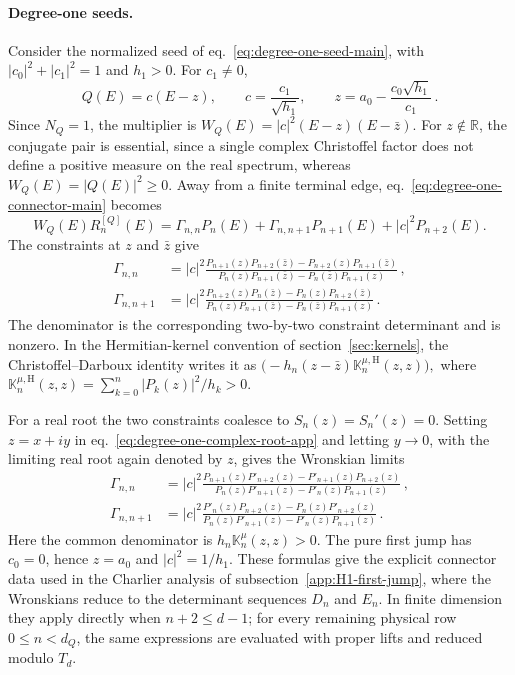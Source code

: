 \documentclass[a4paper,11pt]{article}
\def\ii{i}%
\theoremstyle{definition}
\theoremstyle{remark}
\newcommand{\ii}{\mathrm i}
\newcommand{\RR}{\mathbb R}
\begin{document}
\paragraph{Degree-one seeds.}
Consider the normalized seed of eq.~\eqref{eq:degree-one-seed-main}, with $|c_0|^2+|c_1|^2=1$ and $h_1>0$. For $c_1\ne0$,
\begin{equation}
   Q(E)=c(E-z),
   \qquad
   c=\frac{c_1}{\sqrt{h_1}},
   \qquad
   z=a_0-\frac{c_0\sqrt{h_1}}{c_1}\,.
\end{equation}
Since $N_Q=1$, the multiplier is
$
   W_Q(E)=|c|^2(E-z)(E-\bar z).
$
For $z\notin\RR$, the conjugate pair is essential, since a single complex Christoffel factor does not define a positive measure on the real spectrum, whereas $W_Q(E)=|Q(E)|^2\ge0$. Away from a finite terminal edge, eq.~\eqref{eq:degree-one-connector-main} becomes
\begin{equation}
   W_Q(E)R_n^{[Q]}(E)
   =\Gamma_{n,n}P_n(E)
   +\Gamma_{n,n+1}P_{n+1}(E)
   +|c|^2P_{n+2}(E).
\end{equation}
The constraints at $z$ and $\bar z$ give
\begin{equation}
\begin{aligned}
   \Gamma_{n,n}
   &=|c|^2
   \frac{P_{n+1}(z)P_{n+2}(\bar z)-P_{n+2}(z)P_{n+1}(\bar z)}
   {P_n(z)P_{n+1}(\bar z)-P_n(\bar z)P_{n+1}(z)}\,,\\
   \Gamma_{n,n+1}
   &=|c|^2
   \frac{P_{n+2}(z)P_n(\bar z)-P_n(z)P_{n+2}(\bar z)}
   {P_n(z)P_{n+1}(\bar z)-P_n(\bar z)P_{n+1}(z)}\,.
\end{aligned}
\label{eq:degree-one-complex-root-app}
\end{equation}
The denominator is the corresponding two-by-two constraint determinant and is nonzero. In the Hermitian-kernel convention of section~\ref{sec:kernels}, the Christoffel--Darboux identity writes it as
$
   \bigl(-h_n(z-\bar z)\mathbb K_n^{\mu,\mathrm H}(z,z)\bigr),
$
where $\mathbb K_n^{\mu,\mathrm H}(z,z)=\sum_{k=0}^{n}|P_k(z)|^2/h_k>0$.

For a real root the two constraints coalesce to $S_n(z)=S_n'(z)=0$. Setting $z=x+\ii y$ in eq.~\eqref{eq:degree-one-complex-root-app} and letting $y\to0$, with the limiting real root again denoted by $z$, gives the Wronskian limits
\begin{equation}
\begin{aligned}
   \Gamma_{n,n}
   &=|c|^2
   \frac{P_{n+1}(z)P'_{n+2}(z)-P'_{n+1}(z)P_{n+2}(z)}
   {P_n(z)P'_{n+1}(z)-P'_n(z)P_{n+1}(z)}\,,\\
   \Gamma_{n,n+1}
   &=|c|^2
   \frac{P'_n(z)P_{n+2}(z)-P_n(z)P'_{n+2}(z)}
   {P_n(z)P'_{n+1}(z)-P'_n(z)P_{n+1}(z)}\,.
\end{aligned}
\label{eq:degree-one-real-root-app}
\end{equation}
Here the common denominator is
$h_n\mathbb K_n^\mu(z,z)>0$. The pure first jump has $c_0=0$, hence $z=a_0$ and $|c|^2=1/h_1$. These formulas give the explicit connector data used in the Charlier analysis of subsection~\ref{app:H1-first-jump}, where the Wronskians reduce to the determinant sequences $D_n$ and $E_n$. In finite dimension they apply directly when $n+2\le d-1$; for every remaining physical row $0\le n<d_Q$, the same expressions are evaluated with proper lifts and reduced modulo $T_d$.
\end{document}
